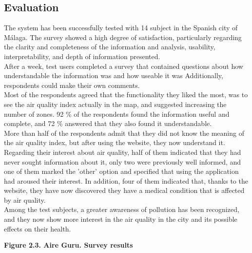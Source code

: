 \subsection*{Evaluation}

The system has been successfully tested with 14 subject in the Spanish city of Málaga.
The survey showed a high degree of satisfaction, particularly regarding the clarity and completeness of the information and analysis,
usability, interpretability, and depth of information presented.\\

After a week, test users completed a survey that contained questions about how understandable the information was and how useable it was
Additionally, respondents could make their own comments.\\

Most of the respondents agreed that the functionality they liked the most, was to see the air quality index actually in the map, and suggested increasing the number of zones.
92 \% of the respondents found the information useful and complete, and 72 \% answered that they also found it understandable.\\

More than half of the respondents admit that they did not know the meaning of the air quality index, but after using the website, they now understand it.\\

Regarding their interest about air quality, half of them indicated that they had never sought information about it,
only two were previously well informed, and one of them marked the 'other' option and specified that using the application had aroused their interest.
In addition, four of them indicated that, thanks to the website, they have now discovered they have a medical condition that is affected by air quality.\\

Among the test subjects, a greater awareness of pollution has been recognized, and they now show more interest in the air quality in the city and its possible effects on their health.

\begin{center}
   \bf Figure 2.3. Aire Guru. Survey results\\
\end{center}